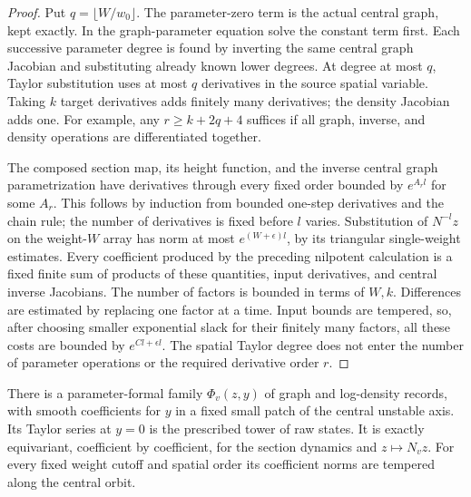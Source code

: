 \begin{proof}
Put $q=\lfloor W/w_0\rfloor$. The parameter-zero term is the actual
central graph, kept exactly. In the graph-parameter equation solve the
constant term first. Each successive parameter degree is found by
inverting the same central graph Jacobian and substituting already
known lower degrees. At degree at most $q$, Taylor substitution uses at
most $q$ derivatives in the source spatial variable. Taking $k$ target
derivatives adds finitely many derivatives; the density Jacobian adds
one. For example, any $r\ge k+2q+4$ suffices if all graph, inverse,
and density operations are differentiated together.

The composed section map, its height function, and the inverse central
graph parametrization have derivatives through every fixed order bounded
by $e^{A_r l}$ for some $A_r$. This follows by induction from bounded
one-step derivatives and the chain rule; the number of derivatives is
fixed before $l$ varies. Substitution of $N^{-l}z$ on the weight-$W$
array has norm at most $e^{(W+\epsilon)l}$, by its triangular
single-weight estimates. Every coefficient produced by the preceding
nilpotent calculation is a fixed finite sum of products of these
quantities, input derivatives, and central inverse Jacobians.
The number of factors is bounded in terms of $W,k$. Differences are
estimated by replacing one factor at a time. Input bounds are tempered,
so, after choosing smaller exponential slack for their finitely many
factors, all these costs are bounded by $e^{Cl+\epsilon l}$.
The spatial Taylor degree does not enter the number of parameter
operations or the required derivative order $r$.
\end{proof}

\begin{lemma}\label{hull:profiles}
There is a parameter-formal family $\Phi_v(z,y)$ of graph and
log-density records, with smooth coefficients for $y$ in a fixed small
patch of the central unstable axis. Its Taylor series at $y=0$ is the
prescribed tower of raw states. It is exactly equivariant, coefficient
by coefficient, for the section dynamics and $z\mapsto N_vz$.
For every fixed weight cutoff and spatial order its coefficient norms
are tempered along the central orbit.
\end{lemma}

